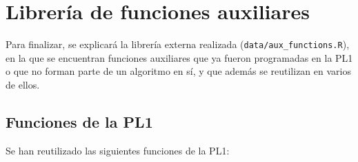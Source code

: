 \documentclass[12pt]{report}\usepackage[]{graphicx}\usepackage[dvipsnames]{xcolor}
\begin{document}
 	\appendix
 	
 	\chapter{Librería de funciones auxiliares}\label{ap:Libreria}
 	
	 	Para finalizar, se explicará la librería externa realizada (\texttt{data/aux\_functions.R}), en la que se encuentran funciones auxiliares que ya fueron programadas en la PL1 o que no forman parte de un algoritmo en sí, y que además se reutilizan en varios de ellos.
	 	
	 	\section{Funciones de la PL1}
	 	
		 	Se han reutilizado las siguientes funciones de la PL1:
		 	
\end{document}
